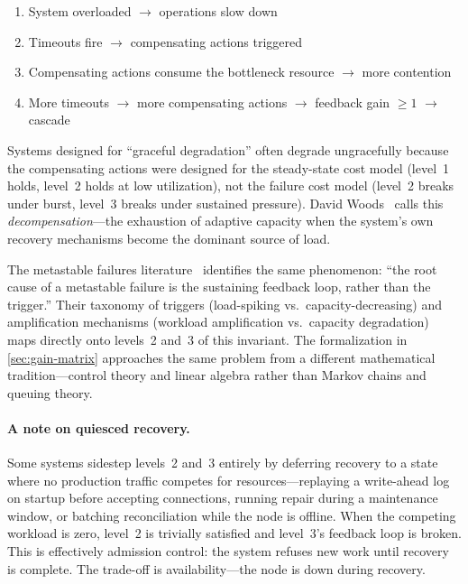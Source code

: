 \documentclass[11pt]{article}
\begin{document}
\begin{enumerate}
  \item System overloaded $\to$ operations slow down
  \item Timeouts fire $\to$ compensating actions triggered
  \item Compensating actions consume the bottleneck resource $\to$ more
    contention
  \item More timeouts $\to$ more compensating actions $\to$ feedback gain
    $\geq 1$ $\to$ cascade
\end{enumerate}

Systems designed for ``graceful degradation'' often degrade ungracefully because
the compensating actions were designed for the steady-state cost model (level~1
holds, level~2 holds at low utilization), not the failure cost model (level~2
breaks under burst, level~3 breaks under sustained pressure). David
Woods~\cite{woods2015four,woods2018theory} calls this \emph{decompensation}---the
exhaustion of adaptive capacity when the system's own recovery mechanisms become
the dominant source of load.

The metastable failures literature~\cite{bronson2021metastable,huang2022metastable}
identifies the same phenomenon: ``the root cause of a metastable failure is the
sustaining feedback loop, rather than the trigger.'' Their taxonomy of triggers
(load-spiking vs.\ capacity-decreasing) and amplification mechanisms (workload
amplification vs.\ capacity degradation) maps directly onto levels~2 and~3 of
this invariant. The formalization in \cref{sec:gain-matrix} approaches the same
problem from a different mathematical tradition---control theory and linear
algebra rather than Markov chains and queuing theory.

\paragraph{A note on quiesced recovery.} Some systems sidestep levels~2 and~3
entirely by deferring recovery to a state where no production traffic competes
for resources---replaying a write-ahead log on startup before accepting
connections, running repair during a maintenance window, or batching
reconciliation while the node is offline. When the competing workload is zero,
level~2 is trivially satisfied and level~3's feedback loop is broken. This is
effectively admission control: the system refuses new work until recovery is
complete. The trade-off is availability---the node is down during recovery.
\end{document}
